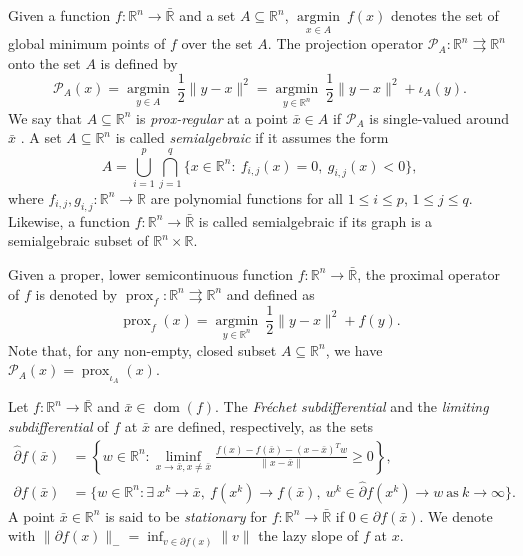 \documentclass[pdflatex,sn-mathphys-num]{sn-jnl}
\numberwithin{equation}{section}%
\def\R{\mathbb{R}}
\def\bR{\bar{\mathbb{R}}}
\def\dom{\operatorname{dom}}
\newcommand{\proj}{\mathcal{P}}
\newcommand{\prox}{\operatorname{prox}}
\theoremstyle{thmstyleone}%
\theoremstyle{thmstyletwo}%
\theoremstyle{thmstylethree}%
\begin{document}
Given a function $f: \R^n\rightarrow \bR$ and a set $A\subseteq \R^n$, $\underset{x\in A}{\operatorname{argmin}} \ f(x)$ denotes  the set of global minimum points of $f$ over the set $A$. The projection operator $\proj_A:\R^n\rightrightarrows \R^n$ onto the set $A$ is defined by
\begin{equation*}
    \proj_A(x) = \underset{y\in A}{\operatorname{argmin}} \ \frac{1}{2}\|y-x\|^2 = \underset{y\in \R^n}{\operatorname{argmin}} \ \frac{1}{2}\|y-x\|^2+\iota_A(y). 
\end{equation*}
We say that $A\subseteq \R^n$ is \emph{prox-regular} at a point $\bar{x}\in A$ if $\proj_A$ is single-valued around $\bar{x}$ \cite[Definition 2.6]{luke2013prox}. A set $A\subseteq \R^n$ is called \emph{semialgebraic} if it assumes the form \cite{Bolte2007}
\begin{equation}\label{eq:semialgebraic}
A = \bigcup_{i=1}^p\bigcap_{j=1}^q\{x\in\R^n: \  f_{i,j}(x) = 0, \ g_{i,j}(x) <0 \},
\end{equation}
where $f_{i,j},g_{i,j}:\R^n\rightarrow \R$ are polynomial functions for all $1\leq i \leq p$, $1\leq j\leq q$. Likewise, a function $f:\R^n\rightarrow\bR$ is called semialgebraic if its graph is a semialgebraic subset of $\R^n\times \R$.

Given a proper, lower semicontinuous function $f:\R^n\rightarrow \bR$, the proximal operator of $f$ is denoted by $\prox_f:\R^n\rightrightarrows \R^n$ and defined as
\begin{equation*}
    \prox_f(x)=\underset{y\in\R^n}{\operatorname{argmin} } \ \frac{1}{2}\|y-x\|^2+f(y).
\end{equation*}
Note that, for any non-empty, closed subset $A\subseteq \R^n$, we have $\proj_A(x) = \prox_{\iota_A}(x)$.

Let $f:\R^n\to\bR$ and $\bar{x}\in\dom(f)$. The \emph{Fr\'{e}chet subdifferential} and the \emph{limiting subdifferential} of $f$ at $\bar{x}$ are defined, respectively, as the sets \cite[Definition 8.3]{Rockafellar-Wets-1998}
\begin{align*}
\hat\partial f(\bar{x}) &= \left\{w\in\R^n : \liminf_{x\to \bar{x},x\neq \bar{x}} \frac {f(x)-f(\bar{x})-(x-\bar{x})^Tw}{\|x-\bar{x}\|}\geq 0\right\},\\
\partial f(\bar{x}) &= \{w\in\R^n : \exists \  x^k\to \bar{x}, \ f(x^k)\to f(\bar{x}), \ w^k \in \hat\partial f(x^k)\to w \ {\text{as}} \ k\to \infty\}.
\end{align*}
A point $\bar{x}\in\R^n$ is said to be \emph{stationary} for $f:\R^n\rightarrow \bR$ if $0\in\partial f(\bar{x})$. {We denote with $\|\partial f(x)\|_{-} = \inf_{v\in\partial f(x)}\|v\|$ the lazy slope of $f$ at $x$.}
\end{document}
